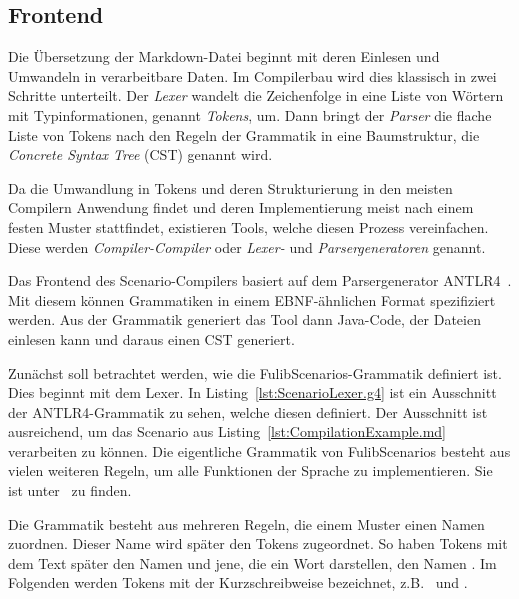 \subsection{Frontend}\label{subsec:frontend-antlr4}

Die Übersetzung der Markdown-Datei beginnt mit deren Einlesen und Umwandeln in verarbeitbare Daten.
Im Compilerbau wird dies klassisch in zwei Schritte unterteilt.
Der \emph{Lexer} wandelt die Zeichenfolge in eine Liste von Wörtern mit Typinformationen, genannt \emph{Tokens}, um.
Dann bringt der \emph{Parser} die flache Liste von Tokens nach den Regeln der Grammatik in eine Baumstruktur, die \emph{Concrete Syntax Tree} (CST) genannt wird.

Da die Umwandlung in Tokens und deren Strukturierung in den meisten Compilern Anwendung findet und deren Implementierung meist nach einem festen Muster stattfindet, existieren Tools, welche diesen Prozess vereinfachen.
Diese werden \emph{Compiler-Compiler} oder \emph{Lexer-} und \emph{Parsergeneratoren} genannt.

Das Frontend des Scenario-Compilers basiert auf dem Parsergenerator ANTLR4~\cite{antlr4-reference}.
Mit diesem können Grammatiken in einem EBNF-ähnlichen Format spezifiziert werden.
Aus der Grammatik generiert das Tool dann Java-Code, der Dateien einlesen kann und daraus einen CST generiert.

Zunächst soll betrachtet werden, wie die FulibScenarios-Grammatik definiert ist.
Dies beginnt mit dem Lexer.
In Listing~\ref{lst:ScenarioLexer.g4} ist ein Ausschnitt der ANTLR4-Grammatik zu sehen, welche diesen definiert.
Der Ausschnitt ist ausreichend, um das Scenario aus Listing~\ref{lst:CompilationExample.md} verarbeiten zu können.
Die eigentliche Grammatik von FulibScenarios besteht aus vielen weiteren Regeln, um alle Funktionen der Sprache zu implementieren.
Sie ist unter~\cite{lexer-grammar} zu finden.


Die Grammatik besteht aus mehreren Regeln, die einem Muster einen Namen zuordnen.
Dieser Name wird später den Tokens zugeordnet.
So haben Tokens mit dem Text  später den Namen  und jene, die ein Wort darstellen, den Namen .
Im Folgenden werden Tokens mit der Kurzschreibweise  bezeichnet, z.B.\  und .

